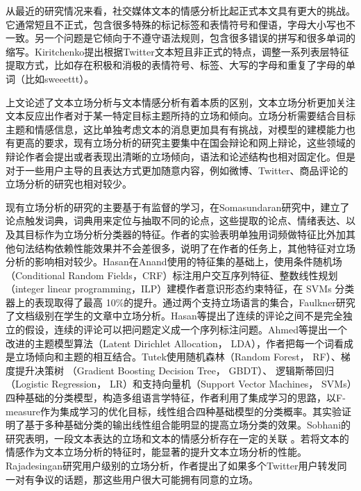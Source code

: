 从最近的研究情况来看，社交媒体文本的情感分析比起正式本文具有更大的挑战。它通常短且不正式，包含很多特殊的标记标签和表情符号和俚语，字母大小写也不一致。另一个问题是它倾向于不遵守语法规则，包含很多错误的拼写和很多单词的缩写。Kiritchenko提出根据Twitter文本短且非正式的特点，调整一系列表层特征提取方式，比如存在积极和消极的表情符号、标签、大写的字母和重复了字母的单词（比如sweeettt）。

上文论述了文本立场分析与文本情感分析有着本质的区别，文本立场分析更加关注文本反应出作者对于某一特定目标主题所持的立场和倾向。立场分析需要结合目标主题和情感信息，这比单独考虑文本的消息更加具有有挑战，对模型的建模能力也有更高的要求，现有立场分析的研究主要集中在国会辩论和网上辩论，这些领域的辩论作者会提出或者表现出清晰的立场倾向，语法和论述结构也相对固定化。但是对于一些用户主导的且表达方式更加随意内容，例如微博、Twitter、商品评论的立场分析的研究也相对较少。

现有立场分析的研究的主要基于有监督的学习，在Somasundaran研究中，建立了论点触发词典，词典用来定位与抽取不同的论点，这些提取的论点、情绪表达、以及其目标作为立场分析分类器的特征。作者的实验表明单独用词频做特征比外加其他句法结构依赖性能效果并不会差很多，说明了在作者的任务上，其他特征对立场分析的影响相对较少。Hasan在Anand使用的特征集的基础上，使用条件随机场（Conditional Random Fields，CRF）标注用户交互序列特征、整数线性规划（integer linear programming，ILP）建模作者意识形态约束特征，在 SVMs 分类器上的表现取得了最高 10\%的提升。通过两个支持立场语言的集合，Faulkner研究了文档级别在学生的文章中立场分析。Hasan等提出了连续的评论之间不是完全独立的假设，连续的评论可以把问题定义成一个序列标注问题。Ahmed等提出一个改进的主题模型算法（Latent Dirichlet Allocation， LDA），作者把每一个词看成是立场倾向和主题的相互结合。Tutek使用随机森林（Random Forest， RF）、梯度提升决策树 （Gradient Boosting Decision Tree， GBDT）、 逻辑斯蒂回归 （Logistic Regression， LR）和支持向量机（Support Vector Machines， SVMs）四种基础的分类模型，构造多组语言学特征，作者利用了集成学习的思路，以F-measure作为集成学习的优化目标，线性组合四种基础模型的分类概率。其实验证明了基于多种基础分类的输出线性组合能明显的提高立场分类的效果。Sobhani的研究表明，一段文本表达的立场和文本的情感分析存在一定的关联 。若将文本的情感作为文本立场分析的特征时，能显著的提升文本立场分析的性能。Rajadesingan研究用户级别的立场分析，作者提出了如果多个Twitter用户转发同一对有争议的话题，那这些用户很大可能拥有同意的立场。

